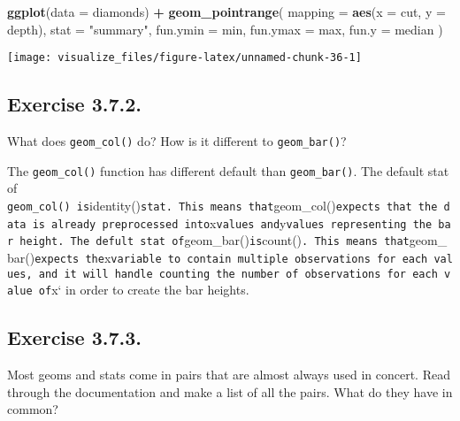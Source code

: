\documentclass[]{book}
\newenvironment{Shaded}{\begin{snugshade}}{\end{snugshade}}
\newcommand{\DataTypeTok}[1]{\textcolor[rgb]{0.13,0.29,0.53}{#1}}
\newcommand{\KeywordTok}[1]{\textcolor[rgb]{0.13,0.29,0.53}{\textbf{#1}}}
\newcommand{\NormalTok}[1]{#1}
\newcommand{\OperatorTok}[1]{\textcolor[rgb]{0.81,0.36,0.00}{\textbf{#1}}}
\newcommand{\StringTok}[1]{\textcolor[rgb]{0.31,0.60,0.02}{#1}}
\theoremstyle{plain}
\theoremstyle{remark}
\begin{document}
\begin{Shaded}
\begin{Highlighting}[]
\KeywordTok{ggplot}\NormalTok{(}\DataTypeTok{data =}\NormalTok{ diamonds) }\OperatorTok{+}
\StringTok{  }\KeywordTok{geom_pointrange}\NormalTok{(}
    \DataTypeTok{mapping =} \KeywordTok{aes}\NormalTok{(}\DataTypeTok{x =}\NormalTok{ cut, }\DataTypeTok{y =}\NormalTok{ depth),}
    \DataTypeTok{stat =} \StringTok{"summary"}\NormalTok{,}
    \DataTypeTok{fun.ymin =}\NormalTok{ min,}
    \DataTypeTok{fun.ymax =}\NormalTok{ max,}
    \DataTypeTok{fun.y =}\NormalTok{ median}
\NormalTok{  )}
\end{Highlighting}
\end{Shaded}

\begin{center}\texttt{[image: visualize\_files/figure-latex/unnamed-chunk-36-1]} \end{center}

\hypertarget{exercise-3.7.2.}{%
\subsection*{\texorpdfstring{Exercise
{3.7.2}.}{Exercise 3.7.2.}}\label{exercise-3.7.2.}}

What does \texttt{geom\_col()} do? How is it different to
\texttt{geom\_bar()}?

The \texttt{geom\_col()} function has different default than
\texttt{geom\_bar()}. The default stat of
\texttt{geom\_col()\ is}identity()\texttt{stat.\ This\ means\ that}geom\_col()\texttt{expects\ that\ the\ data\ is\ already\ preprocessed\ into}x\texttt{values\ and}y\texttt{values\ representing\ the\ bar\ height.\ The\ defult\ stat\ of}geom\_bar()\texttt{is}count()\texttt{.\ This\ means\ that}geom\_bar()\texttt{expects\ the}x\texttt{variable\ to\ contain\ multiple\ observations\ for\ each\ values,\ and\ it\ will\ handle\ counting\ the\ number\ of\ observations\ for\ each\ value\ of}x`
in order to create the bar heights.

\hypertarget{exercise-3.7.3.}{%
\subsection*{\texorpdfstring{Exercise
{3.7.3}.}{Exercise 3.7.3.}}\label{exercise-3.7.3.}}

Most geoms and stats come in pairs that are almost always used in
concert. Read through the documentation and make a list of all the
pairs. What do they have in common?
\end{document}
